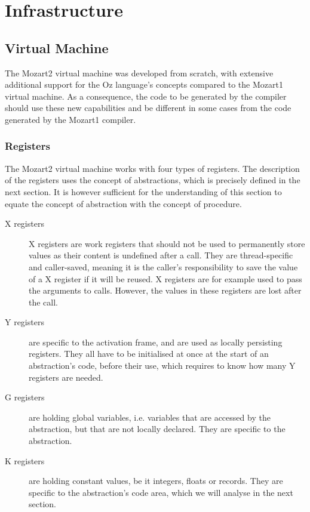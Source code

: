 \documentclass[a4paper]{memoir}
\begin{document}
\chapter{Infrastructure}
\section{Virtual Machine}
The Mozart2 virtual machine was developed from scratch, with extensive additional support for the Oz language's concepts compared to the Mozart1 virtual machine. As a consequence, the code to be generated by the compiler should use these new capabilities and be different in some cases from the code generated by the Mozart1 compiler.


\subsection{Registers}\label{sec:intro:registers}
The Mozart2 virtual machine works with four types of registers. The description of the registers uses the concept of abstractions, which is precisely defined in the next section. It is however sufficient for the understanding of this section to equate the concept of abstraction with the concept of procedure.
\begin{description}
  \item[X registers]X registers are work registers that should not be used to permanently
    store values as their content is undefined after a call. They are thread-specific and caller-saved, meaning it is the
    caller's responsibility to save the value of a X register if it will be
    reused.  X registers are for example used to pass the arguments to calls. However, the values in these registers are lost after the call.
  \item[Y registers]are specific to the activation frame, and are used as locally persisting registers. They all have to be initialised at once at the start of an abstraction's code, before their use, which requires to know how many Y registers are needed.
  \item[G registers] are holding global variables, i.e. variables that are
    accessed by the abstraction, but that are not locally declared. They are
    specific to the abstraction.
  \item[K registers] are holding constant values, be it integers, floats or
    records. They are specific to the abstraction's code area, which we will analyse in the
    next section.
\end{description}
\end{document}
